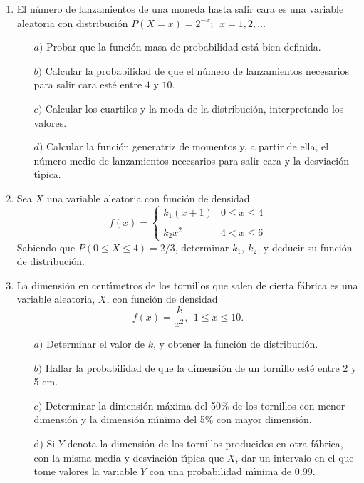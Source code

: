 \documentclass[11pt]{book}
\begin{document}
\begin{enumerate}
 \vskip 0.75cm \item  El n{\'u}mero de lanzamientos de una moneda hasta salir cara es  una variable aleatoria
con distribuci{\'o}n  $P(X = x)  =  2^{-x};\ \ x = 1, 2, \ldots$
     \begin{enumerate}
       \item [$a)$] Probar que la funci{\'o}n masa de probabilidad est{\'a} bien definida.
\item [$b)$] Calcular la probabilidad de que el n{\'u}mero de lanzamientos necesarios para salir cara est{\'e} entre $4$ y $10$.
\item [$c)$] Calcular los cuartiles y la moda de la distribuci{\'o}n, interpretando los valores.
\item [$d)$] Calcular la funci{\'o}n generatriz de momentos y, a partir de ella, el n{\'u}mero medio de lanzamientos necesarios para salir cara y la desviaci{\'o}n t{\'\i}pica.
     \end{enumerate}
\vskip 0.75cm \item Sea $X$ una variable aleatoria con funci{\'o}n de densidad
     $$
     f(x) = \left \{
     \begin{array}{lc}
       k_{1} (x+1) & 0 \leq x \leq 4 \\
       \\ k_{2} x^{2} & 4 <x \leq 6
     \end{array}
     \right.
     $$
Sabiendo que  $P(0 \leq X \leq 4) = 2/3$,  determinar $k_{1},\ k_{2}$, y
deducir su funci{\'o}n de distribuci{\'o}n.

\vskip 0.75cm  \item  La dimensi{\'o}n en cent{\'\i}metros  de  los tornillos  que salen
de cierta f{\'a}brica es una  variable aleatoria, $X$, con funci{\'o}n de densidad
     $$
     f(x) = \displaystyle{\frac{k}{x^{2}}},\ \    1 \leq x \leq 10.
     $$
     \begin{enumerate}
       \item [$a)$]Determinar el valor de $k$, y obtener la funci{\'o}n de distribuci{\'o}n.
       \item [$b)$] Hallar la probabilidad de que la dimensi{\'o}n de un tornillo
             est{\'e}  entre 2 y 5 cm.
       \item [$c)$] Determinar la  dimensi{\'o}n  m{\'a}xima  del 50\%  de los tornillos con menor dimensi{\'o}n y
       la dimensi{\'o}n m{\'\i}nima del 5\%
             con mayor dimensi{\'o}n.
\item [d)] Si $Y$ denota la dimensi{\'o}n de los tornillos producidos en   otra f{\'a}brica, con la misma media y desviaci{\'o}n t{\'\i}pica que $X$,
dar un intervalo en el que tome valores la variable $Y$ con  una probabilidad
m{\'\i}nima de 0.99.
     \end{enumerate}


\end{enumerate}
\end{document}
